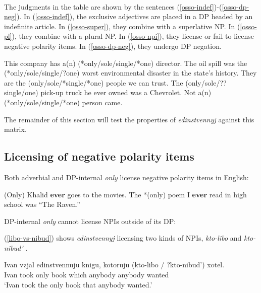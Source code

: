 \documentclass{article}
\begin{document}
\ \\

The judgments in the table are shown by the sentences (\ref{osso-indef})-(\ref{osso-dp-neg}). In (\ref{osso-indef}), the exclusive adjectives are placed in a DP headed by an indefinite article. In (\ref{osso-super}), they combine with a superlative NP. In (\ref{osso-pl}), they combine with a plural NP. In (\ref{osso-npi}), they license or fail to license negative polarity items. In (\ref{osso-dp-neg}), they undergo DP negation.

\begin{exe}
	\ex \label{osso-indef} This company has a(n) (*only/sole/single/*one) director.
	\ex \label{osso-super} The oil spill was the (*only/sole/single/?one) worst environmental disaster in the state's history.
	\ex \label{osso-pl} They are the (only/sole/*single/*one) people we can trust.
	\ex \label{osso-npi} The (only/sole/??single/one) pick-up truck he ever owned was a Chevrolet.
	\ex \label{osso-dp-neg} Not a(n) (*only/sole/single/*one) person came.
\end{exe}

The remainder of this section will test the properties of \textit{edinstvennyj} against this matrix.

\subsection{Licensing of negative polarity items}
Both adverbial and DP-internal \textit{only} license negative polarity items in English:

\begin{exe}
	\ex *(Only) Khalid \textbf{ever} goes to the movies.
	\ex The *(only) poem I \textbf{ever} read in high school was ``The Raven.''
\end{exe}

DP-internal \textit{only} cannot license NPIs outside of its DP:

\begin{exe}
\end{exe}

(\ref{libo-vs-nibud}) shows \textit{edinstvennyj} licensing two kinds of NPIs, \textit{kto-libo} \citep{pereltsvaig06} and \textit{kto-nibud'} \citep{russneg}.

\begin{exe}
	\ex \label{libo-vs-nibud} \gll Ivan vzjal edinstvennuju knigu, kotoruju (kto-libo / ?kto-nibud') xotel.\\
	Ivan took only book which anybody {} anybody wanted\\
	\glt `Ivan took the only book that anybody wanted.'
\end{exe}
\end{document}
